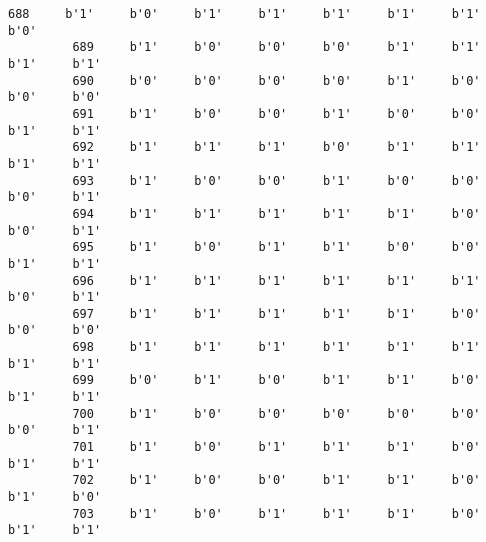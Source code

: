 \documentclass[11pt]{article}
\begin{document}
\begin{Verbatim}[commandchars=\\\{\}]
         688     b'1'     b'0'     b'1'     b'1'     b'1'     b'1'     b'1'     b'0'   
         689     b'1'     b'0'     b'0'     b'0'     b'1'     b'1'     b'1'     b'1'   
         690     b'0'     b'0'     b'0'     b'0'     b'1'     b'0'     b'0'     b'0'   
         691     b'1'     b'0'     b'0'     b'1'     b'0'     b'0'     b'1'     b'1'   
         692     b'1'     b'1'     b'1'     b'0'     b'1'     b'1'     b'1'     b'1'   
         693     b'1'     b'0'     b'0'     b'1'     b'0'     b'0'     b'0'     b'1'   
         694     b'1'     b'1'     b'1'     b'1'     b'1'     b'0'     b'0'     b'1'   
         695     b'1'     b'0'     b'1'     b'1'     b'0'     b'0'     b'1'     b'1'   
         696     b'1'     b'1'     b'1'     b'1'     b'1'     b'1'     b'0'     b'1'   
         697     b'1'     b'1'     b'1'     b'1'     b'1'     b'0'     b'0'     b'0'   
         698     b'1'     b'1'     b'1'     b'1'     b'1'     b'1'     b'1'     b'1'   
         699     b'0'     b'1'     b'0'     b'1'     b'1'     b'0'     b'1'     b'1'   
         700     b'1'     b'0'     b'0'     b'0'     b'0'     b'0'     b'0'     b'1'   
         701     b'1'     b'0'     b'1'     b'1'     b'1'     b'0'     b'1'     b'1'   
         702     b'1'     b'0'     b'0'     b'1'     b'1'     b'0'     b'1'     b'0'   
         703     b'1'     b'0'     b'1'     b'1'     b'1'     b'0'     b'1'     b'1'   
         

\end{Verbatim}
\end{document}
